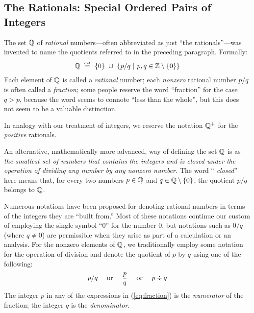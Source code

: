 \subsection{The Rationals: Special Ordered Pairs of Integers}
\label{sec:define-rationals}

The set $\mathbb{Q}$ of {\it rational}   numbers---often abbreviated as just
``the rationals''---was invented to name the quotients referred to in
the preceding paragraph.  Formally:
\[ \mathbb{Q} \ \stackrel{\mbox{{\tiny def}}}{=} \ \{0\} \ \cup \ \left\{ p/q \ | \ p, q \in \mathbb{Z}
\setminus \{0\} \right\}
\]
Each element of $\mathbb{Q}$ is called a {\it rational} number;
 each {\em nonzero} rational number $p/q$ is
often called a {\em fraction};  some people
reserve the word ``fraction'' for the case $q > p$, because the word
seems to connote ``less than the whole'', but this does not seem to be
a valuable distinction.

In analogy with our treatment of integers, we reserve the notation
$\mathbb{Q}^+$ for the {\em positive} rationals.

An alternative, mathematically more advanced, way of defining the set
$\mathbb{Q}$ is as {\em the smallest set of numbers that contains the integers
  and is closed under the operation of dividing any number by any
  nonzero number.}   The word ``{\it
  closed}'' here means that, for every two numbers $p \in \mathbb{Q}$ and $q
\in \mathbb{Q} \setminus \{0\}$, the quotient $p/q$ belongs to $\mathbb{Q}$.

Numerous notations have been proposed for denoting rational numbers in
terms of the integers they are ``built from.''  Most of these
notations continue our custom of employing the single symbol ``$0$''
for the number $0$, but notations such as $0/q$ (where $q \neq 0$) are
permissible when they arise as part of a calculation or an analysis.
For the nonzero elements of $\mathbb{Q}$, we traditionally employ some
notation for the operation of division and denote the quotient of $p$
by $q$ using one of the following:
\begin{equation}
\label{eq:fraction}
 p/q \ \ \ \mbox{ or } \ \ \ {p \over q} \ \ \ \mbox{ or } \ \ \ p
 \div q
\end{equation}
The integer $p$ in any of the expressions in (\ref{eq:fraction}) is
the {\it numerator}
of the fraction; the integer $q$ is the {\it denominator}.


